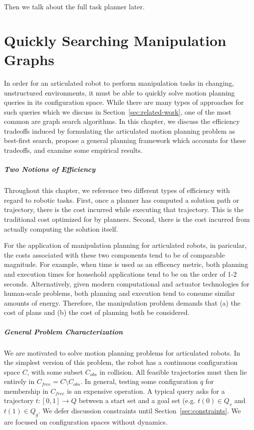 \documentclass{report}
\begin{document}
Then we talk about the full task planner later.


\newpage
\chapter{Quickly Searching Manipulation Graphs}
\label{chap:inflate}

In order for an articulated robot to perform manipulation tasks
in changing, unstructured environments,
it must be able to quickly solve motion planning queries in its
configuration space.
While there are many types of approaches for such queries
which we discuss in Section~\ref{sec:related-work},
one of the most common are graph search algorithms.
In this chapter,
we discuss the efficiency tradeoffs induced by formulating
the articulated motion planning problem as best-first search,
propose a general planning framework which accounts for these tradeoffs,
and examine some empirical results.

\paragraph{Two Notions of Efficiency}

Throughout this chapter,
we reference two different types of efficiency
with regard to robotic tasks.
First, once a planner has computed a solution path or trajectory,
there is the cost incurred while executing that trajectory.
This is the traditional cost optimized for by planners.
Second, there is the cost incurred from actually computing the solution
itself.

For the application of manipulation planning for articulated robots,
in paricular,
the costs associated with these two components tend to be of comparable
magnitude.
For example,
when time is used as an efficency metric,
both planning and execution times for household applications
tend to be on the order of 1-2 seconds.
Alternatively, given
modern computational and actuator technologies for human-scale problems,
both planning and execution tend to consume similar amounts of energy.
Therefore,
the manipulation problem demands that
(a) the cost of plans and
(b) the cost of planning both be considered.

\paragraph{General Problem Characterization}

We are motivated to solve motion planning problems for articulated robots.
In the simplest version of this problem,
the robot has a continuous configuration space $C$,
with some subset $C_{obs}$ in collision.
All feasible trajectories must then lie entirely in
$C_{free} = C \setminus C_{obs}$.
In general, testing some configuration $q$ for membership in $C_{free}$
is an expensive operation.
A typical query asks for a trajectory $t: [0,1] \rightarrow Q$ between
a start set and a goal set (e.g. $t(0) \in Q_s$ and $t(1) \in Q_g$.
We defer discussion constraints until Section~\ref{sec:constraints}.
We are focused on configuration spaces without dynamics.
\end{document}
